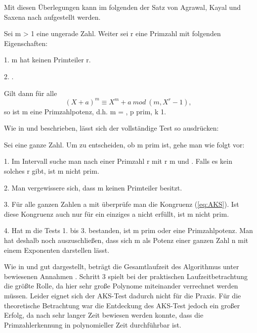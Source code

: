 		Mit diesen Überlegungen kann im folgenden der Satz von Agrawal, Kayal und Saxena nach \cite{Algorithmische:Zahlentheorie} aufgestellt werden.
		
		Sei m > 1 eine ungerade Zahl. Weiter sei r eine Primzahl mit folgenden Eigenschaften:
		
		1. m hat keinen Primteiler \myMathRM{\leq} r.
		
		2. .
		
		Gilt dann für alle 
		\begin{equation} \label{eq:AKS}		
			(X + a)^m \equiv X^m + a~mod~(m,X^r - 1),
		\end{equation}
		so ist m eine Primzahlpotenz, d.h. m = , p prim, k \myMathRM{\geq} 1.
		
		Wie in \cite{Algorithmische:Zahlentheorie} und \cite{Algebraische:und:zahlentheoretische:Grundlagen:fuer:die:Informatik} beschrieben, lässt sich der vollständige Test so ausdrücken:
		
		Sei  eine ganze Zahl. Um zu entscheiden, ob m prim ist, gehe man
		wie folgt vor:
		
		1. Im Intervall  suche man nach einer Primzahl r mit
		r \myNichtTeiler m und .
		Falls es kein solches r gibt, ist m nicht prim.
		
		2. Man vergewissere sich, dass m keinen Primteiler  besitzt.
		
		3. Für alle ganzen Zahlen a mit  überprüfe man die Kongruenz (\ref{eq:AKS}).
		Ist diese Kongruenz auch nur für ein einziges a nicht erfüllt, ist m nicht prim.
		
		4. Hat m die Tests 1. bis 3. bestanden, ist m prim oder eine Primzahlpotenz.
		Man hat deshalb noch auszuschließen, dass sich m als Potenz  einer
		ganzen Zahl n mit einem Exponenten  darstellen lässt.
		
		Wie in \cite{Algorithmische:Zahlentheorie} und \cite{Algebraische:und:zahlentheoretische:Grundlagen:fuer:die:Informatik} gut dargestellt, beträgt die Gesamtlaufzeit des Algorithmus unter bewiesenen Annahmen . Schritt 3 spielt bei der praktischen Laufzeitbetrachtung die größte Rolle, da hier sehr große Polynome miteinander verrechnet werden müssen. Leider eignet sich der AKS-Test dadurch nicht für die Praxis. Für die theoretische Betrachtung war die Entdeckung des AKS-Test jedoch ein großer Erfolg, da nach sehr langer Zeit bewiesen werden konnte, dass die Primzahlerkennung in polynomieller Zeit durchführbar ist.
		